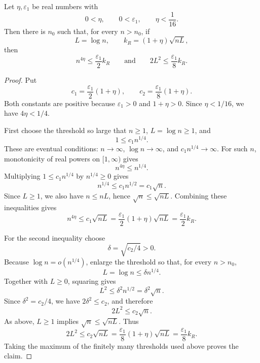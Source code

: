 \begin{helper}
Let \(\eta,\varepsilon_1\) be real numbers with
\[
0<\eta,\qquad 0<\varepsilon_1,\qquad \eta<\frac1{16}.
\]
Then there is \(n_0\) such that, for every \(n>n_0\), if
\[
L=\log n,\qquad k_R=(1+\eta)\sqrt{nL},
\]
then
\[
n^{4\eta}\le\frac{\varepsilon_1}{2}k_R
\qquad\text{and}\qquad
2L^2\le\frac{\varepsilon_1}{8}k_R.
\]
\end{helper}
\begin{proof}
Put
\[
c_1=\frac{\varepsilon_1}{2}(1+\eta),\qquad
c_2=\frac{\varepsilon_1}{8}(1+\eta).
\]
Both constants are positive because \(\varepsilon_1>0\) and
\(1+\eta>0\).  Since \(\eta<1/16\), we have \(4\eta<1/4\).

First choose the threshold so large that \(n\ge1\), \(L=\log n\ge1\), and
\[
1\le c_1 n^{1/4}.
\]
These are eventual conditions: \(n\to\infty\), \(\log n\to\infty\), and
\(c_1n^{1/4}\to\infty\).  For such \(n\), monotonicity of real powers on
\([1,\infty)\) gives
\[
n^{4\eta}\le n^{1/4}.
\]
Multiplying \(1\le c_1n^{1/4}\) by \(n^{1/4}\ge0\) gives
\[
n^{1/4}\le c_1n^{1/2}=c_1\sqrt n.
\]
Since \(L\ge1\), we also have \(n\le nL\), hence
\(\sqrt n\le\sqrt{nL}\).  Combining these inequalities gives
\[
n^{4\eta}\le c_1\sqrt{nL}
=\frac{\varepsilon_1}{2}(1+\eta)\sqrt{nL}
=\frac{\varepsilon_1}{2}k_R.
\]

For the second inequality choose
\[
\delta=\sqrt{c_2/4}>0.
\]
Because \(\log n=o(n^{1/4})\), enlarge the threshold so that, for every
\(n>n_0\),
\[
L=\log n\le\delta n^{1/4}.
\]
Together with \(L\ge0\), squaring gives
\[
L^2\le \delta^2 n^{1/2}=\delta^2\sqrt n.
\]
Since \(\delta^2=c_2/4\), we have \(2\delta^2\le c_2\), and therefore
\[
2L^2\le c_2\sqrt n.
\]
As above, \(L\ge1\) implies \(\sqrt n\le\sqrt{nL}\).  Thus
\[
2L^2\le c_2\sqrt{nL}
=\frac{\varepsilon_1}{8}(1+\eta)\sqrt{nL}
=\frac{\varepsilon_1}{8}k_R.
\]
Taking the maximum of the finitely many thresholds used above proves the
claim.
\end{proof}
